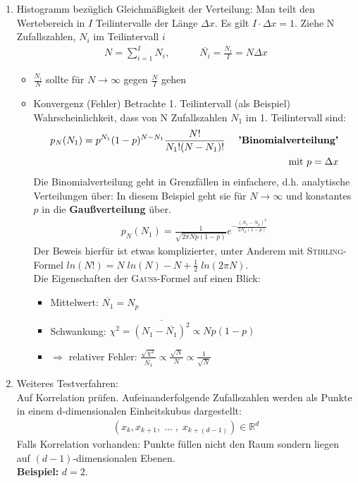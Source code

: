 \documentclass[12pt]{article}
\begin{document}
\begin{enumerate}
\item Histogramm bezüglich Gleichmäßigkeit der Verteilung: Man teilt den Wertebereich in $I$ Teilintervalle der Länge $\Delta x$. Es gilt $I \cdot \Delta x = 1$.  Ziehe N Zufallszahlen, $N_i$ im Teilintervall $i$
\begin{align}
N = \sum _{i=1}^I N_i, \quad \quad \quad \overline{N_i} = \frac{N_i}{I}= N \Delta x
\end{align}
\begin{itemize}
\item $\frac{N_i}{N}$ sollte für $N \to \infty $ gegen $\frac{N}{I}$ gehen
\item Konvergenz (Fehler) %
Betrachte 1. Teilintervall (als Beispiel) Wahrscheinlichkeit, dass von N Zufallszahlen $N_1$ im 1. Teilintervall sind: 
\begin{align}
p_N (N_1) = p^{N_1} (1-p)^{N-N_1} \frac{N!}{N_1 ! (N-N_1)!} \quad  \mbox{ \textbf{'Binomialverteilung'}} \\
 \mbox{ mit } p= \Delta x
\end{align}
Die Binomialverteilung geht in Grenzfällen in einfachere, d.h. analytische Verteilungen über: In diesem Beispiel geht sie für $N \to \infty$ und konstantes $p$ in die \textbf{ Gaußverteilung} über.
\begin{align}
p_N (N_1) = \frac{1}{\sqrt{2 \pi N p (1-p)}} e^{- \frac{(N_1 - N_p)^2}{2 N_p (1-p)}}
\end{align}
Der Beweis hierfür ist etwas komplizierter, unter Anderem mit \textsc{Stirling}-Formel $ln(N!) = N \; ln(N) - N + \frac{1}{2} \; ln( 2 \pi N)$. \\
Die Eigenschaften der \textsc{Gauß}-Formel auf einen Blick:
\begin{itemize}
\item Mittelwert: $\overline{N_1}= N_p$
\item Schwankung: $\chi ^2 = \overline{(N_1 - \overline{N_1})^2} \propto N p (1-p)$ 
\item $\Rightarrow$ relativer Fehler: $\frac{\sqrt{\chi ^2}}{\overline{N_1}} \propto \frac{\sqrt{N}}{N} \propto \frac{1}{\sqrt{N}}$ 
\end{itemize}
\end{itemize}
\item Weiteres Testverfahren: \\
Auf Korrelation prüfen. Aufeinanderfolgende Zufallszahlen werden als Punkte in einem d-dimensionalen Einheitskubus dargestellt:
\begin{align}
(x_k, x_{k+1}, \; ...\; ,\; x_{k+(d-1)}) \in \mathbb{R}^d
\end{align}
Falls Korrelation vorhanden: Punkte füllen nicht den Raum sondern liegen auf $(d-1)$-dimensionalen Ebenen. \\
\textbf{Beispiel:} $d=2$. 


\end{enumerate}
\end{document}
